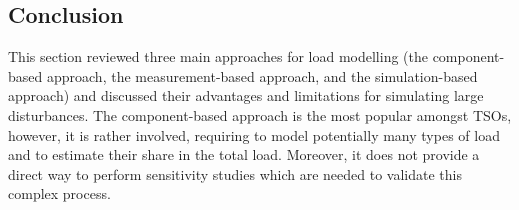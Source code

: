 



\subsection{Conclusion}
\label{sec:distrib_review_conclusion}

This section reviewed three main approaches for load modelling (the component-based approach, the measurement-based approach, and the simulation-based approach) and discussed their advantages and limitations for simulating large disturbances. The component-based approach is the most popular amongst TSOs, however, it is rather involved, requiring to model potentially many types of load and to estimate their share in the total load. Moreover, it does not provide a direct way to perform sensitivity studies which are needed to validate this complex process.

